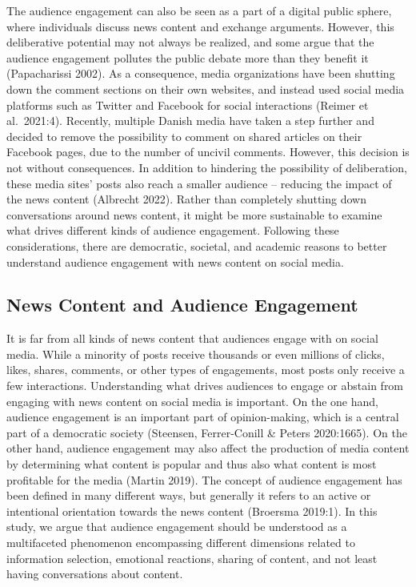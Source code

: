 \documentclass[
]{article}
\begin{document}
The audience engagement can also be seen as a part of a digital public
sphere, where individuals discuss news content and exchange arguments.
However, this deliberative potential may not always be realized, and
some argue that the audience engagement pollutes the public debate more
than they benefit it (Papacharissi 2002). As a consequence, media
organizations have been shutting down the comment sections on their own
websites, and instead used social media platforms such as Twitter and
Facebook for social interactions (Reimer et al.~2021:4). Recently,
multiple Danish media have taken a step further and decided to remove
the possibility to comment on shared articles on their Facebook pages,
due to the number of uncivil comments. However, this decision is not
without consequences. In addition to hindering the possibility of
deliberation, these media sites' posts also reach a smaller audience --
reducing the impact of the news content (Albrecht 2022). Rather than
completely shutting down conversations around news content, it might be
more sustainable to examine what drives different kinds of audience
engagement. Following these considerations, there are democratic,
societal, and academic reasons to better understand audience engagement
with news content on social media.

\hypertarget{news-content-and-audience-engagement}{%
\subsection{News Content and Audience
Engagement}\label{news-content-and-audience-engagement}}

It is far from all kinds of news content that audiences engage with on
social media. While a minority of posts receive thousands or even
millions of clicks, likes, shares, comments, or other types of
engagements, most posts only receive a few interactions. Understanding
what drives audiences to engage or abstain from engaging with news
content on social media is important. On the one hand, audience
engagement is an important part of opinion-making, which is a central
part of a democratic society (Steensen, Ferrer-Conill \& Peters
2020:1665). On the other hand, audience engagement may also affect the
production of media content by determining what content is popular and
thus also what content is most profitable for the media (Martin 2019).
The concept of audience engagement has been defined in many different
ways, but generally it refers to an active or intentional orientation
towards the news content (Broersma 2019:1). In this study, we argue that
audience engagement should be understood as a multifaceted phenomenon
encompassing different dimensions related to information selection,
emotional reactions, sharing of content, and not least having
conversations about content.
\end{document}
